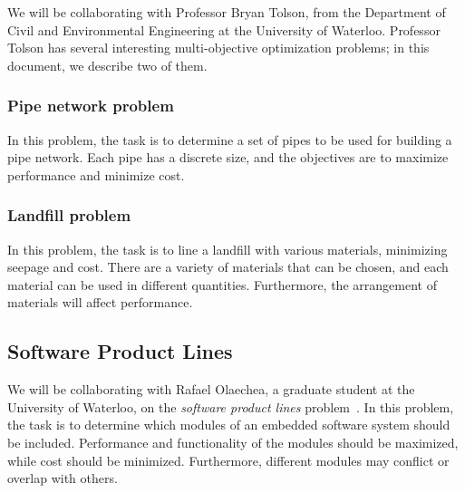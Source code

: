 \documentclass[11pt]{article}
\begin{document}
We will be collaborating with Professor Bryan Tolson, from the
Department of Civil and Environmental Engineering at the University of
Waterloo. Professor Tolson has several interesting multi-objective
optimization problems; in this document, we describe two of them.

\subsubsection{Pipe network problem}\label{sec:pipes}

In this problem, the task is to determine a set of pipes to be used for
building a pipe network. Each pipe has a discrete size, and the
objectives are to maximize performance and minimize cost.

\subsubsection{Landfill problem}\label{sec:landfill}

In this problem, the task is to line a landfill with various materials,
minimizing seepage and cost. There are a variety of materials that can
be chosen, and each material can be used in different quantities.
Furthermore, the arrangement of materials will affect performance.

\subsection{Software Product Lines}\label{sec:sw_product_lines}

We will be collaborating with Rafael Olaechea, a graduate student at
the University of Waterloo, on the \textit{software product lines}
problem~\cite{ref:Olaechea12}. In this problem, the task is to
determine which modules of an embedded software system should be
included. Performance and functionality of the modules should be
maximized, while cost should be minimized. Furthermore, different
modules may conflict or overlap with others.


\printbibliography[heading=bibintoc]
\end{document}
